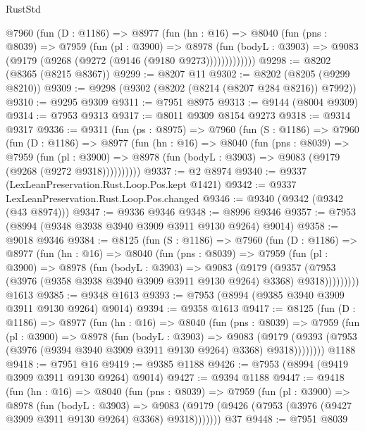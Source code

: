 \begin{lexlean}{RustStd}
\begin{coremodule}
        @7960
          (fun (D : @1186) =>
          @8977
            (fun (hn : @16) =>
            @8040
              (fun (pns : @8039) =>
              @7959
                (fun (pl : @3900) =>
                @8978
                  (fun (bodyL : @3903) =>
                  @9083 (@9179 (@9268 (@9272 (@9146 (@9180 @9273)))))))))))))
@9298 := @8202 (@8365 (@8215 @8367))
@9299 := @8207 @11
@9302 := @8202 (@8205 (@9299 @8210))
@9309 := @9298 (@9302 (@8202 (@8214 (@8207 @284 @8216)) @7992))
@9310 := @9295 @9309
@9311 := @7951 @8975
@9313 := @9144 (@8004 @9309)
@9314 := @7953 @9313
@9317 := @8011 @9309 @8154 @9273
@9318 := @9314 @9317
@9336 := @9311
    (fun (ps : @8975) =>
    @7960
      (fun (S : @1186) =>
      @7960
        (fun (D : @1186) =>
        @8977
          (fun (hn : @16) =>
          @8040
            (fun (pns : @8039) =>
            @7959
              (fun (pl : @3900) =>
              @8978 (fun (bodyL : @3903) => @9083 (@9179 (@9268 (@9272 @9318))))))))))
@9337 := @2 @8974
@9340 := @9337 (LexLeanPreservation.Rust.Loop.Pos.kept @1421)
@9342 := @9337 LexLeanPreservation.Rust.Loop.Pos.changed
@9346 := @9340 (@9342 (@9342 (@43 @8974)))
@9347 := @9336 @9346
@9348 := @8996 @9346
@9357 := @7953 (@8994 (@9348 @3938 @3940 @3909 @3911 @9130 @9264) @9014)
@9358 := @9018 @9346
@9384 := @8125
    (fun (S : @1186) =>
    @7960
      (fun (D : @1186) =>
      @8977
        (fun (hn : @16) =>
        @8040
          (fun (pns : @8039) =>
          @7959
            (fun (pl : @3900) =>
            @8978
              (fun (bodyL : @3903) =>
              @9083
                (@9179
                  (@9357
                    (@7953 (@3976 (@9358 @3938 @3940 @3909 @3911 @9130 @9264) @3368) @9318)))))))))
    @1613
@9385 := @9348 @1613
@9393 := @7953 (@8994 (@9385 @3940 @3909 @3911 @9130 @9264) @9014)
@9394 := @9358 @1613
@9417 := @8125
    (fun (D : @1186) =>
    @8977
      (fun (hn : @16) =>
      @8040
        (fun (pns : @8039) =>
        @7959
          (fun (pl : @3900) =>
          @8978
            (fun (bodyL : @3903) =>
            @9083
              (@9179 (@9393 (@7953 (@3976 (@9394 @3940 @3909 @3911 @9130 @9264) @3368) @9318))))))))
    @1188
@9418 := @7951 @16
@9419 := @9385 @1188
@9426 := @7953 (@8994 (@9419 @3909 @3911 @9130 @9264) @9014)
@9427 := @9394 @1188
@9447 := @9418
    (fun (hn : @16) =>
    @8040
      (fun (pns : @8039) =>
      @7959
        (fun (pl : @3900) =>
        @8978
          (fun (bodyL : @3903) =>
          @9083 (@9179 (@9426 (@7953 (@3976 (@9427 @3909 @3911 @9130 @9264) @3368) @9318)))))))
    @37
@9448 := @7951 @8039

\end{coremodule}
\end{lexlean}
